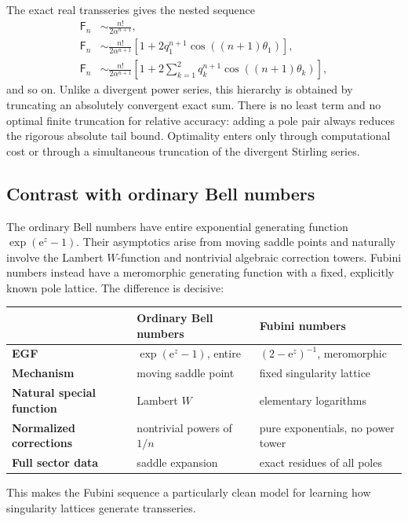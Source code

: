 \documentclass[11pt,a4paper]{article}
\theoremstyle{definition}
\theoremstyle{remark}
\newcommand{\Fub}{\mathsf F}
\newcommand{\e}{\mathrm e}
\begin{document}
The exact real transseries gives the nested sequence
\begin{align*}
 \Fub_n
 &\sim \frac{n!}{2\alpha^{n+1}},\\
 \Fub_n
 &\sim \frac{n!}{2\alpha^{n+1}}
 \left[1+2q_1^{n+1}\cos((n+1)\theta_1)\right],\\
 \Fub_n
 &\sim \frac{n!}{2\alpha^{n+1}}
 \left[1+2\sum_{k=1}^{2}q_k^{n+1}
 \cos((n+1)\theta_k)\right],
\end{align*}
and so on.  Unlike a divergent power series, this hierarchy is obtained by
truncating an absolutely convergent exact sum.  There is no least term and no
optimal finite truncation for relative accuracy: adding a pole pair always
reduces the rigorous absolute tail bound.  Optimality enters only through
computational cost or through a simultaneous truncation of the divergent
Stirling series.

\subsection{Contrast with ordinary Bell numbers}

The ordinary Bell numbers have entire exponential generating function
\(
 \exp(\e^z-1)
\).  Their asymptotics arise from moving saddle points and naturally involve
the Lambert \(W\)-function and nontrivial algebraic correction towers.  Fubini
numbers instead have a meromorphic generating function with a fixed, explicitly
known pole lattice.  The difference is decisive:

\begin{center}
\begin{tabularx}{\textwidth}{@{}>{\bfseries}l>{\raggedright\arraybackslash}X>{\raggedright\arraybackslash}X@{}}
\toprule
&Ordinary Bell numbers&Fubini numbers\\
\midrule
EGF&\(\exp(\e^z-1)\), entire&\((2-\e^z)^{-1}\), meromorphic\\
Mechanism&moving saddle point&fixed singularity lattice\\
Natural special function&Lambert \(W\)&elementary logarithms\\
Normalized corrections&nontrivial powers of \(1/n\)&pure exponentials, no power tower\\
Full sector data&saddle expansion&exact residues of all poles\\
\bottomrule
\end{tabularx}
\end{center}

This makes the Fubini sequence a particularly clean model for learning how
singularity lattices generate transseries.
\end{document}

